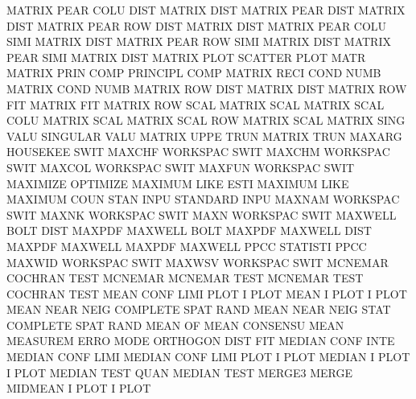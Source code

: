 MATRIX   PEAR COLU DIST                 MATRIX   DIST
MATRIX   PEAR DIST                      MATRIX   DIST
MATRIX   PEAR ROW  DIST                 MATRIX   DIST
MATRIX   PEAR COLU SIMI                 MATRIX   DIST
MATRIX   PEAR ROW  SIMI                 MATRIX   DIST
MATRIX   PEAR SIMI                      MATRIX   DIST
MATRIX   PLOT                           SCATTER  PLOT MATR
MATRIX   PRIN COMP                      PRINCIPL COMP
MATRIX   RECI COND NUMB                 MATRIX   COND NUMB
MATRIX   ROW  DIST                      MATRIX   DIST
MATRIX   ROW  FIT                       MATRIX   FIT
MATRIX   ROW  SCAL                      MATRIX   SCAL
MATRIX   SCAL COLU                      MATRIX   SCAL
MATRIX   SCAL ROW                       MATRIX   SCAL
MATRIX   SING VALU                      SINGULAR VALU
MATRIX   UPPE TRUN                      MATRIX   TRUN
MAXARG                                  HOUSEKEE SWIT
MAXCHF                                  WORKSPAC SWIT
MAXCHM                                  WORKSPAC SWIT
MAXCOL                                  WORKSPAC SWIT
MAXFUN                                  WORKSPAC SWIT
MAXIMIZE                                OPTIMIZE
MAXIMUM  LIKE ESTI                      MAXIMUM  LIKE
MAXIMUM  COUN STAN INPU                 STANDARD INPU
MAXNAM                                  WORKSPAC SWIT
MAXNK                                   WORKSPAC SWIT
MAXN                                    WORKSPAC SWIT
MAXWELL  BOLT DIST                      MAXPDF
MAXWELL  BOLT                           MAXPDF
MAXWELL  DIST                           MAXPDF
MAXWELL                                 MAXPDF
MAXWELL  PPCC                           STATISTI PPCC
MAXWID                                  WORKSPAC SWIT
MAXWSV                                  WORKSPAC SWIT
MCNEMAR                                 COCHRAN  TEST
MCNEMAR                                 MCNEMAR  TEST
MCNEMAR  TEST                           COCHRAN  TEST
MEAN     CONF LIMI PLOT                 I        PLOT
MEAN     I    PLOT                      I        PLOT
MEAN     NEAR NEIG                      COMPLETE SPAT RAND
MEAN     NEAR NEIG STAT                 COMPLETE SPAT RAND
MEAN     OF   MEAN                      CONSENSU MEAN
MEASUREM ERRO MODE                      ORTHOGON DIST FIT
MEDIAN   CONF INTE                      MEDIAN   CONF LIMI
MEDIAN   CONF LIMI PLOT                 I        PLOT
MEDIAN   I    PLOT                      I        PLOT
MEDIAN   TEST QUAN                      MEDIAN   TEST
MERGE3                                  MERGE
MIDMEAN  I    PLOT                      I        PLOT
